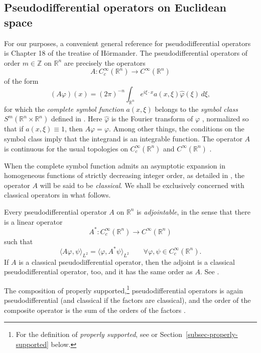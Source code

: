 \documentclass[leqno,11pt]{amsart}
\numberwithin{equation}{subsection}
\theoremstyle{plain}
\theoremstyle{definition}
\theoremstyle{remark}
\newcommand{\R}{\mathbb{R}}
\newcommand{\Z}{\mathbb{Z}}
\begin{document}
\subsection{Pseudodifferential operators on Euclidean space} 
\label{sec-psdos-on-r-n}
For our purposes, a convenient general reference for pseudodifferential operators is Chapter 18 of the treatise \cite{HormanderVolIII} of H\"ormander.  The pseudodifferential operators of order $m\in \Z$ on $\R^n$ are precisely the   operators 
\begin{equation}
    \label{eq-an-operator-on-r-n}
A \colon C_c^\infty (\R^n) \longrightarrow C^\infty (\R^n)
\end{equation}
of the form
\begin{equation}
\label{eq-fmla-for-psdo}
(A\varphi )(x) =  (2\pi)^{-n} \int _{\R^n} e^{i\xi\cdot x} a(x,\xi) \hat \varphi (\xi)\, d\xi ,
\end{equation}
for which  the \emph{complete symbol function} $a(x,\xi)$ belongs to the \emph{symbol class} $S^m (\R^n{\times} \R^n)$ defined in  \cite[Def.\ 18.1.1]{HormanderVolIII}. Here $\hat \varphi$ is the Fourier transform of $\varphi$ \cite[Def.\,7.1.1]{HormanderVolI}, normalized so that if $a(x,\xi)\equiv 1$, then $A\varphi = \varphi$. Among other things, the conditions on the symbol class imply that the integrand is an integrable function. The operator $A$   is continuous for the usual  topologies on $C_c^\infty (\R^n)$ and $C^\infty (\R^n)$ \cite[Thm.\ 18.1.6]{HormanderVolIII}.

When the complete symbol function admits an asymptotic expansion in homogeneous functions of strictly decreasing integer order, as detailed in \cite[Prop.\ 18.1.3 and Def.\ 18.1.5]{HormanderVolIII}, the operator $A$ will be said to be \emph{classical}.  We shall be exclusively concerned with classical operators in what follows. 





Every pseudodifferential operator $A$  on $\R^n$  is \emph{adjointable}, in the sense that there is a linear operator 
\[
A^* \colon C_c^\infty (\R^n) \longrightarrow C^\infty (\R^n) 
\]
such that 
\[
\langle A\varphi,\psi \rangle_{L^2} = \langle \varphi, A^* \psi\rangle_{L^2} \qquad \forall \varphi,\psi\in C_c^\infty (\R^n) .
\]
If $A$ is a classical  pseudodifferential operator, then the adjoint is a classical pseudodifferential operator, too, and it has the same order as $A$. See \cite[Thm.~18.1.7]{HormanderVolIII}.  

The composition of properly supported,\footnote{For the definition of \emph{properly supported}, see \cite[Def.\ 18.1.21]{HormanderVolIII} or Section~\ref{subsec-properly-supported} below.}  pseudodifferential operators is again pseudodifferential (and classical if the factors are classical), and the order of the composite operator is the sum of the orders of the factors \cite[Thm.~18.1.8]{HormanderVolIII}.   
\end{document}

